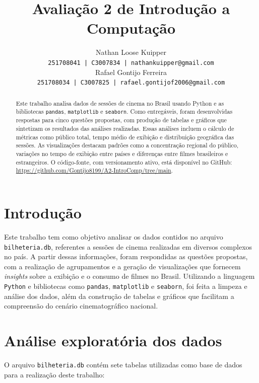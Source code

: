 \documentclass{article}
\title{Avaliação 2 de Introdução a Computação}
\author{Nathan Loose Kuipper \\ \small{\texttt{251708041 | C3007834 | nathankuipper@gmail.com}} \\ Rafael Gontijo Ferreira \\ \small{\texttt{251708034 | C3007825 | rafael.gontijof2006@gmail.com}} }
\begin{document}
\maketitle

\begin{abstract}
Este trabalho analisa dados de sessões de cinema no Brasil usando Python e as bibliotecas \texttt{pandas}, \texttt{matplotlib} e \texttt{seaborn}. Como entregáveis, foram desenvolvidas respostas para cinco questões propostas, com produção de tabelas e gráficos que sintetizam os resultados das análises realizadas. Essas análises incluem o cálculo de métricas como público total, tempo médio de exibição e distribuição geográfica das sessões. As visualizações destacam padrões como a concentração regional do público, variações no tempo de exibição entre países e diferenças entre filmes brasileiros e estrangeiros. O código-fonte, com versionamento ativo, está disponível no GitHub: \url{https://github.com/Gontijo8199/A2-IntroComp/tree/main}.
\end{abstract}
\pagebreak
\section{Introdução}
Este trabalho tem como objetivo analisar os dados contidos no arquivo \texttt{bilheteria.db}, referentes a sessões de cinema realizadas em diversos complexos no país. A partir dessas informações, foram respondidas as questões propostas, com a realização de agrupamentos e a geração de visualizações que fornecem \textit{insights} sobre a exibição e o consumo de filmes no Brasil. Utilizando a linguagem \texttt{Python} e bibliotecas como \texttt{pandas}, \texttt{matplotlib} e \texttt{seaborn}, foi feita a limpeza e análise dos dados, além da construção de tabelas e gráficos que facilitam a compreensão do cenário cinematográfico nacional.

\section{Análise exploratória dos dados}

O arquivo \texttt{bilheteria.db} contém sete tabelas utilizadas como base de dados para a realização deste trabalho:
\end{document}
